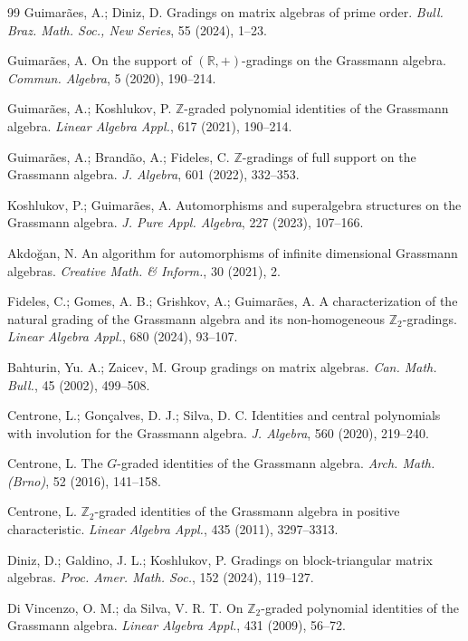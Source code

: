 \documentclass{article}
\begin{document}
\begin{thebibliography}{99}
		 Guimarães, A.; Diniz, D. Gradings on matrix algebras of prime order. \textit{Bull. Braz. Math. Soc., New Series}, 55 (2024), 1–23.
		
		 Guimarães, A. On the support of $(\mathbb{R},+)$-gradings on the Grassmann algebra. \textit{Commun. Algebra}, 5 (2020), 190–214.
		
		 Guimarães, A.; Koshlukov, P. $\mathbb{Z}$-graded polynomial identities of the Grassmann algebra. \textit{Linear Algebra Appl.}, 617 (2021), 190–214.
		
		 Guimarães, A.; Brandão, A.; Fideles, C. $\mathbb{Z}$-gradings of full support on the Grassmann algebra. \textit{J. Algebra}, 601 (2022), 332–353.
		
		 Koshlukov, P.; Guimarães, A. Automorphisms and superalgebra structures on the Grassmann algebra. \textit{J. Pure Appl. Algebra}, 227 (2023), 107–166.
		
		 Akdoğan, N. An algorithm for automorphisms of infinite dimensional Grassmann algebras. \textit{Creative Math. \& Inform.}, 30 (2021), 2.
		
		 Fideles, C.; Gomes, A. B.; Grishkov, A.; Guimarães, A. A characterization of the natural grading of the Grassmann algebra and its non-homogeneous $\mathbb{Z}_2$-gradings. \textit{Linear Algebra Appl.}, 680 (2024), 93–107.
		
		 Bahturin, Yu. A.; Zaicev, M. Group gradings on matrix algebras. \textit{Can. Math. Bull.}, 45 (2002), 499–508.
		
		 Centrone, L.; Gonçalves, D. J.; Silva, D. C. Identities and central polynomials with involution for the Grassmann algebra. \textit{J. Algebra}, 560 (2020), 219–240.
		
		 Centrone, L. The $G$-graded identities of the Grassmann algebra. \textit{Arch. Math. (Brno)}, 52 (2016), 141–158.
		
		 Centrone, L. $\mathbb{Z}_2$-graded identities of the Grassmann algebra in positive characteristic. \textit{Linear Algebra Appl.}, 435 (2011), 3297–3313.
		
		 Diniz, D.; Galdino, J. L.; Koshlukov, P. Gradings on block-triangular matrix algebras. \textit{Proc. Amer. Math. Soc.}, 152 (2024), 119–127.
		
		 Di Vincenzo, O. M.; da Silva, V. R. T. On $\mathbb{Z}_2$-graded polynomial identities of the Grassmann algebra. \textit{Linear Algebra Appl.}, 431 (2009), 56–72.
		

\end{thebibliography}
\end{document}
